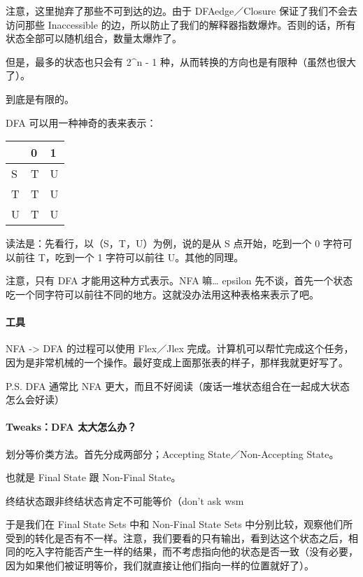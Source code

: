 \documentclass[
]{article}
\begin{document}
注意，这里抛弃了那些不可到达的边。由于 DFAedge／Closure
保证了我们不会去访问那些 Inaccessible
的边，所以防止了我们的解释器指数爆炸。否则的话，所有状态全部可以随机组合，数量太爆炸了。

但是，最多的状态也只会有 2\^{}n - 1
种，从而转换的方向也是有限种（虽然也很大了）。

到底是有限的。

DFA 可以用一种神奇的表来表示：

\begin{longtable}[]{@{}lll@{}}
\toprule
& 0 & 1\tabularnewline
\midrule
\endhead
S & T & U\tabularnewline
T & T & U\tabularnewline
U & T & U\tabularnewline
\bottomrule
\end{longtable}

读法是：先看行，以（S，T，U）为例，说的是从 S 点开始，吃到一个 0
字符可以前往 T，吃到一个 1 字符可以前往 U。其他的同理。

注意，只有 DFA 才能用这种方式表示。NFA 嘛\ldots{} epsilon
先不谈，首先一个状态吃一个同字符可以前往不同的地方。这就没办法用这种表格来表示了吧。

\hypertarget{header-n84}{%
\paragraph{工具}\label{header-n84}}

NFA -\textgreater{} DFA 的过程可以使用 Flex／Jlex
完成。计算机可以帮忙完成这个任务，因为是非常机械的一个操作。最好变成上面那张表的样子，那样我就更好写了。

P.S. DFA 通常比 NFA
更大，而且不好阅读（废话一堆状态组合在一起成大状态怎么会好读）

\hypertarget{header-n87}{%
\paragraph{Tweaks：DFA 太大怎么办？}\label{header-n87}}

划分等价类方法。首先分成两部分；Accepting State／Non-Accepting State。

也就是 Final State 跟 Non-Final State。

终结状态跟非终结状态肯定不可能等价（don't ask wsm

于是我们在 Final State Sets 中和 Non-Final State Sets
中分别比较，观察他们所受到的转化是否有不一样。注意，我们要看的只有输出，看到达这个状态之后，相同的吃入字符能否产生一样的结果，而不考虑指向他的状态是否一致（没有必要，因为如果他们被证明等价，我们就直接让他们指向一样的位置就好了）。
\end{document}
